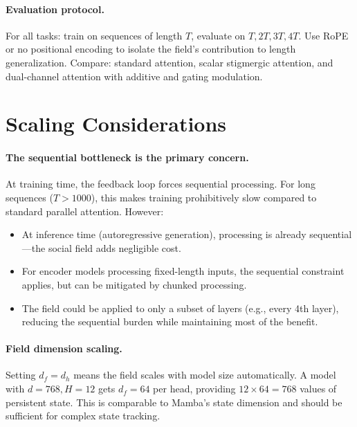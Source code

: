 \documentclass[11pt,a4paper]{article}
\begin{document}
\paragraph{Evaluation protocol.}
For all tasks: train on sequences of length $T$, evaluate on
$T, 2T, 3T, 4T$.  Use RoPE or no positional encoding to isolate
the field's contribution to length generalization.  Compare:
standard attention, scalar stigmergic attention, and dual-channel
attention with additive and gating modulation.


\section{Scaling Considerations}
\label{sec:scaling}

\paragraph{The sequential bottleneck is the primary concern.}
At training time, the feedback loop forces sequential processing.
For long sequences ($T > 1000$), this makes training prohibitively
slow compared to standard parallel attention.  However:
\begin{itemize}
    \item At inference time (autoregressive generation), processing
          is already sequential---the social field adds negligible cost.
    \item For encoder models processing fixed-length inputs, the
          sequential constraint applies, but can be mitigated by
          chunked processing.
    \item The field could be applied to only a subset of layers
          (e.g., every 4th layer), reducing the sequential burden
          while maintaining most of the benefit.
\end{itemize}

\paragraph{Field dimension scaling.}
Setting $d_f = d_h$ means the field scales with model size
automatically.  A model with $d = 768, H = 12$ gets $d_f = 64$
per head, providing $12 \times 64 = 768$ values of persistent
state.  This is comparable to Mamba's state dimension and
should be sufficient for complex state tracking.
\end{document}
